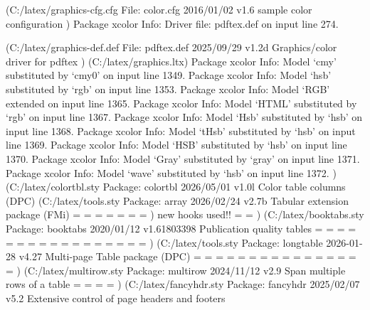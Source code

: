 (C:\MikTeX\tex/latex/graphics-cfg\color.cfg
File: color.cfg 2016/01/02 v1.6 sample color configuration
)
Package xcolor Info: Driver file: pdftex.def on input line 274.

(C:\MikTeX\tex/latex/graphics-def\pdftex.def
File: pdftex.def 2025/09/29 v1.2d Graphics/color driver for pdftex
)
(C:\MikTeX\tex/latex/graphics\mathcolor.ltx)
Package xcolor Info: Model `cmy' substituted by `cmy0' on input line 1349.
Package xcolor Info: Model `hsb' substituted by `rgb' on input line 1353.
Package xcolor Info: Model `RGB' extended on input line 1365.
Package xcolor Info: Model `HTML' substituted by `rgb' on input line 1367.
Package xcolor Info: Model `Hsb' substituted by `hsb' on input line 1368.
Package xcolor Info: Model `tHsb' substituted by `hsb' on input line 1369.
Package xcolor Info: Model `HSB' substituted by `hsb' on input line 1370.
Package xcolor Info: Model `Gray' substituted by `gray' on input line 1371.
Package xcolor Info: Model `wave' substituted by `hsb' on input line 1372.
)
(C:\MikTeX\tex/latex/colortbl.sty
Package: colortbl 2026/05/01 v1.0l Color table columns (DPC)
 (C:\MikTeX\tex/latex/tools\array.sty
Package: array 2026/02/24 v2.7b Tabular extension package (FMi)
\col@sep=
\ar@mcellbox=
\extrarowheight=
\NC@list=
\extratabsurround=
\backup@length=
\ar@cellbox=
)
new hooks used!!
\minrowclearance=
\rownum=
) (C:\MikTeX\tex/latex/booktabs\booktabs.sty
Package: booktabs 2020/01/12 v1.61803398 Publication quality tables
\heavyrulewidth=
\lightrulewidth=
\cmidrulewidth=
\belowrulesep=
\belowbottomsep=
\aboverulesep=
\abovetopsep=
\cmidrulesep=
\cmidrulekern=
=
\@cmidla=
\@cmidlb=
\@aboverulesep=
\@belowrulesep=
\@thisruleclass=
\@lastruleclass=
\@thisrulewidth=
)
(C:\MikTeX\tex/latex/tools\longtable.sty
Package: longtable 2026-01-28 v4.27 Multi-page Table package (DPC)
\LTleft=
\LTright=
\LTpre=
\LTpost=
\LTchunksize=
\LTcapwidth=
\LT@head=
\LT@firsthead=
\LT@foot=
\LT@lastfoot=
\LT@gbox=
\LT@cols=
\LT@rows=
\c@LT@tables=
\c@LT@chunks=
\LT@p@ftn=
)
(C:\MikTeX\tex/latex/multirow\multirow.sty
Package: multirow 2024/11/12 v2.9 Span multiple rows of a table
\multirow@colwidth=
\multirow@cntb=
\multirow@dima=
\bigstrutjot=
)
(C:\MikTeX\tex/latex/fancyhdr\fancyhdr.sty
Package: fancyhdr 2025/02/07 v5.2 Extensive control of page headers and footers

